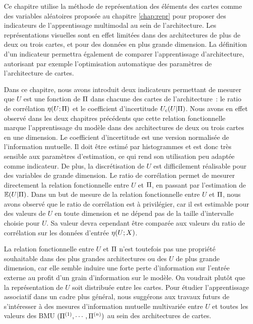 \documentclass[../main]{subfiles}
\begin{document}
Ce chapitre utilise la méthode de représentation des éléments des cartes comme des variables aléatoires proposée au chapitre \ref{chap:repr} pour proposer des indicateurs de l'apprentissage multimodal au sein de l'architecture.
Les représentations visuelles sont en effet limitées dans des architectures de plus de deux ou trois cartes, et pour des données en plus grande dimension. La définition d'un indicateur permettra également de comparer l'apprentissage d'architecture, autorisant par exemple l'optimisation automatique des paramètres de l'architecture de cartes.

Dans ce chapitre, nous avons introduit deux indicateurs permettant de mesurer que $U$ est une fonction de $\Pi$ dans chacune des cartes de l'architecture~: le ratio de corrélation $\eta(U;\Pi)$ et le coefficient d'incertitude $U_c(U|\Pi)$.
Nous avons en effet observé dans les deux chapitres précédents que cette relation fonctionnelle marque l'apprentissage du modèle dans des architectures de deux ou trois cartes en une dimension.
Le coefficient d'incertitude est une version normalisée de l'information mutuelle. Il doit être estimé par histogrammes et est donc très sensible aux paramètres d'estimation, ce qui rend son utilisation peu adaptée comme indicateur. De plus, la discrétisation de $U$ est difficilement réalisable pour des variables de grande dimension.
Le ratio de corrélation permet de mesurer directement la relation fonctionnelle entre $U$ et $\Pi$, en passant par l'estimation de $\mathbb{E}(U|\Pi)$.
Dans un but de mesure de la relation fonctionnelle entre $U$ et $\Pi$, nous avons observé que le ratio de corrélation est à privilégier, car il est estimable pour des valeurs de $U$ en toute dimension et ne dépend pas de la taille d'intervalle choisie pour $U$. Sa valeur devra cependant être comparée aux valeurs du ratio de corrélation sur les données d'entrée $\eta(U;X)$.

La relation fonctionnelle entre $U$ et $\Pi$ n'est toutefois pas une propriété souhaitable dans des plus grandes architectures ou des $U$ de plus grande dimension, car elle semble induire une forte perte d'information sur l'entrée externe au profit d'un grain d'information sur le modèle. 
On voudrait plutôt que la représentation de $U$ soit distribuée entre les cartes.
Pour étudier l'apprentissage associatif dans un cadre plus général, nous suggérons aux travaux futurs de s'intéresser à des mesures d'information mutuelle multivariée entre $U$ et toutes les valeurs des BMU $(\Pi^{({1})}, \cdots, \Pi^{({n})})$ au sein des architectures de cartes.
\end{document}
